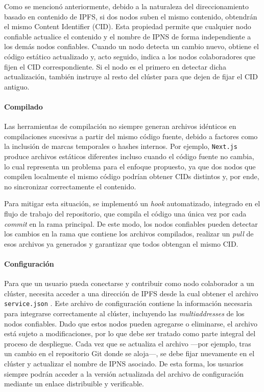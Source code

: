 Como se mencionó anteriormente, debido a la naturaleza del direccionamiento basado en contenido de IPFS, si dos nodos suben el mismo contenido, obtendrán el mismo Content Identifier (CID). Esta propiedad permite que cualquier nodo confiable actualice el contenido y el nombre de IPNS de forma independiente a los demás nodos confiables. Cuando un nodo detecta un cambio nuevo, obtiene el código estático actualizado y, acto seguido, indica a los nodos colaboradores que fijen el CID correspondiente. Si el nodo es el primero en detectar dicha actualización, también instruye al resto del clúster para que dejen de fijar el CID antiguo.

\paragraph{Compilado} Las herramientas de compilación no siempre generan archivos idénticos en compilaciones sucesivas a partir del mismo código fuente, debido a factores como la inclusión de marcas temporales o hashes internos. Por ejemplo, \texttt{Next.js} produce archivos estáticos diferentes incluso cuando el código fuente no cambia, lo cual representa un problema para el enfoque propuesto, ya que dos nodos que compilen localmente el mismo código podrían obtener CIDs distintos y, por ende, no sincronizar correctamente el contenido.

Para mitigar esta situación, se implementó un \textit{hook} automatizado, integrado en el flujo de trabajo del repositorio, que compila el código una única vez por cada \textit{commit} en la rama principal. De este modo, los nodos confiables pueden detectar los cambios en la rama que contiene los archivos compilados, realizar un \textit{pull} de esos archivos ya generados y garantizar que todos obtengan el mismo CID.

\paragraph{Configuración} Para que un usuario pueda conectarse y contribuir como nodo colaborador a un clúster, necesita acceder a una dirección de IPFS desde la cual obtener el archivo \texttt{service.json} \cite{service-json}. Este archivo de configuración contiene la información necesaria para integrarse correctamente al clúster, incluyendo las \textit{multiaddresses} \cite{multiaddr} de los nodos confiables.
Dado que estos nodos pueden agregarse o eliminarse, el archivo está sujeto a modificaciones, por lo que debe ser tratado como parte integral del proceso de despliegue. Cada vez que se actualiza el archivo —por ejemplo, tras un cambio en el repositorio Git donde se aloja—, se debe fijar nuevamente en el clúster y actualizar el nombre de IPNS asociado. De esta forma, los usuarios siempre podrán acceder a la versión actualizada del archivo de configuración mediante un enlace distribuible y verificable.

